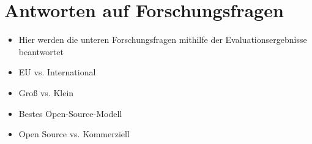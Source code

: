 \section{Antworten auf Forschungsfragen}\label{sec:antworten-auf-forschungsfragen}

\begin{itemize}
    \item Hier werden die unteren Forschungsfragen mithilfe der Evaluationsergebnisse beantwortet
    \item EU vs. International
    \item Groß vs. Klein
    \item Bestes Open-Source-Modell
    \item Open Source vs. Kommerziell
\end{itemize}